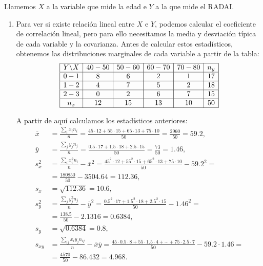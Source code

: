 {Llamemos $X$ a la variable que mide la edad e $Y$ a la que mide el RADAI.
\begin{enumerate}
\item Para ver si existe relación lineal entre $X$ e $Y$, podemos calcular el
coeficiente de correlación lineal, pero para ello necesitamos la media y
desviación típica de cada variable y la covarianza. Antes de calcular estos
estadísticos, obtenemos las distribuciones marginales de cada variable a
partir de la tabla:
\[
\begin{array}{|c|c|c|c|c|c|}
\hline
 Y\backslash X & 40-50 & 50-60 & 60-70 & 70-80 & n_y \\
\hline
         0-1          &   8   &   6   &   2   &   1  & 17 \\
\hline
         1-2          &   4   &   7   &   5   &   2  & 18 \\
\hline
         2-3          &   0   &   2   &   6   &   7  & 15 \\
\hline
         n_x        &  12   &  15   &  13   &  10  & 50 \\
\hline
\end{array}
\]

A partir de aquí calculamos los estadísticos anteriores:
\begin{align*}
\overline{x} &=
\frac{\sum_{i}^{}x_{i}n_{i}}{n} = \frac{45\cdot 12+55\cdot 15+65\cdot
13+75\cdot 10}{50} = \frac{2960}{50} = 59.2,  \\
\overline{y} &=
\frac{\sum_{j}^{}y_{j}n_{j}}{n} = \frac{0.5\cdot 17+1.5\cdot 18+2.5\cdot
15}{50} = \frac{73}{50} = 1.46,  \\
s_{x}^{2} &= \frac{\sum_{i}^{}x_{i}^2n_{i}}{n}-\overline{x}^2 =
\frac{45^2\cdot 12+55^2\cdot 15+65^2\cdot
13+75\cdot 10}{50}-59.2^2 = \\
&= \frac{180850}{50}-3504.64 = 112.36,  \\
s_{x} &= \sqrt{112.36} = 10.6,  \\
s_{y}^{2} &= \frac{\sum_{j}^{}y_{j}^2n_{j}}{n}-\overline{y}^2 =
\frac{0.5^2\cdot 17+1.5^2\cdot 18+2.5^2\cdot
15}{50}-1.46^2 =\\
&= \frac{138.5}{50}-2.1316 = 0.6384,  \\
s_{y} &= \sqrt{0.6384} = 0.8,  \\
s_{xy} &=
\frac{\sum_{ij}^{}x_{i}y_{j}n_{ij}}{n}-\overline{x}\overline{y} =
\frac{45\cdot 0.5\cdot 8+55\cdot 1.5\cdot 4+ \cdots +75\cdot 2.5\cdot
7}{50}-59.2\cdot 1.46 =\\
&= \frac{4570}{50}-86.432 = 4.968.
\end{align*}


\end{enumerate}}
